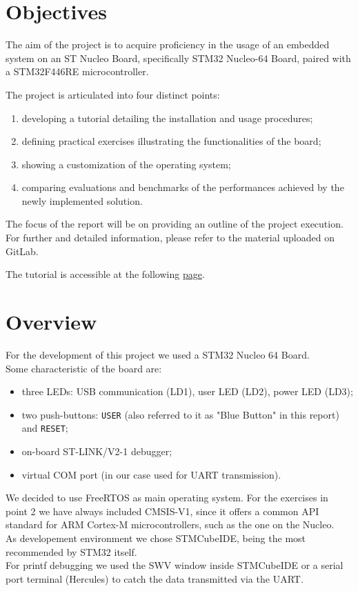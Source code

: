 \documentclass[a4paper,11pt]{report}
\begin{document}
\section{Objectives}
The aim of the project is to acquire proficiency in the usage of an embedded system on an ST Nucleo Board, specifically STM32 Nucleo-64 Board, paired with a STM32F446RE microcontroller.

The project is articulated into four distinct points:
\begin{enumerate}
    \item developing a tutorial detailing the installation and usage procedures;
    \item defining practical exercises illustrating the functionalities of the board;
    \item showing a customization of the operating system;
    \item comparing evaluations and benchmarks of the performances achieved by the newly implemented solution.
\end{enumerate}

The focus of the report will be on providing an outline of the project execution. For further and detailed information, please refer to the material uploaded on GitLab.

The tutorial is accessible at the following \href{https://baltig.polito.it/caos2023/group2/-/blob/point1/point1.md}{page}.

\section{Overview}
For the development of this project we used a STM32 Nucleo 64 Board. \\
Some characteristic of the board are: 
\begin{itemize}
\item three LEDs:  USB communication (LD1), user LED (LD2), power LED (LD3);
\item two push-buttons: \texttt{USER} (also referred to it as "Blue Button" in this report) and \texttt{RESET};
\item on-board ST-LINK/V2-1 debugger;
\item virtual COM port (in our case used for UART transmission).
\end{itemize}
We decided to use FreeRTOS as main operating system. 
For the exercises in point 2 we have always included CMSIS-V1, since it offers a common API standard for ARM Cortex-M microcontrollers, such as the one on the Nucleo.  \\
As developement environment we chose STMCubeIDE, being the most recommended by STM32 itself.\\ 
For printf debugging we used the SWV window inside STMCubeIDE or a serial port terminal (Hercules) to catch the data transmitted via the UART.
\end{document}
